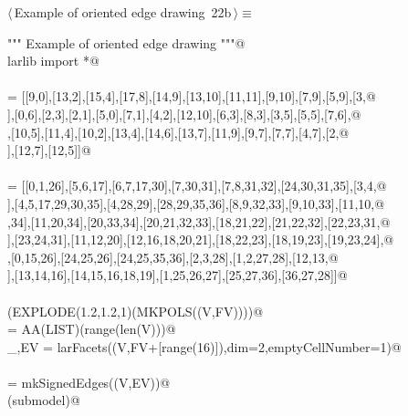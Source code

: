 \documentclass[11pt,oneside]{article}	%
\begin{document}
\begin{flushleft} \small \label{scrap36}
\protect{}$\langle\,$Example of oriented edge drawing\nobreak\ {\footnotesize 22b}$\,\rangle\equiv$
\vspace{-1ex}
\begin{list}{}{} \item
\mbox{}\verb@""" Example of oriented edge drawing """@\\
\mbox{}\verb@from larlib import *@\\
\mbox{}\verb@@\\
\mbox{}\verb@V = [[9,0],[13,2],[15,4],[17,8],[14,9],[13,10],[11,11],[9,10],[7,9],[5,9],[3,@\\
\mbox{}],[0,6],[2,3],[2,1],[5,0],[7,1],[4,2],[12,10],[6,3],[8,3],[3,5],[5,5],[7,6],@\\
\mbox{}\verb@[8,5],[10,5],[11,4],[10,2],[13,4],[14,6],[13,7],[11,9],[9,7],[7,7],[4,7],[2,@\\
\mbox{}],[12,7],[12,5]]@\\
\mbox{}\verb@@\\
\mbox{}\verb@FV = [[0,1,26],[5,6,17],[6,7,17,30],[7,30,31],[7,8,31,32],[24,30,31,35],[3,4,@\\
\mbox{}],[4,5,17,29,30,35],[4,28,29],[28,29,35,36],[8,9,32,33],[9,10,33],[11,10,@\\
\mbox{},34],[11,20,34],[20,33,34],[20,21,32,33],[18,21,22],[21,22,32],[22,23,31,@\\
\mbox{}],[23,24,31],[11,12,20],[12,16,18,20,21],[18,22,23],[18,19,23],[19,23,24],@\\
\mbox{}\verb@[15,19,24,26],[0,15,26],[24,25,26],[24,25,35,36],[2,3,28],[1,2,27,28],[12,13,@\\
\mbox{}],[13,14,16],[14,15,16,18,19],[1,25,26,27],[25,27,36],[36,27,28]]@\\
\mbox{}\verb@@\\
\mbox{}\verb@VIEW(EXPLODE(1.2,1.2,1)(MKPOLS((V,FV))))@\\
\mbox{}\verb@VV = AA(LIST)(range(len(V)))@\\
\mbox{}\verb@_,EV = larFacets((V,FV+[range(16)]),dim=2,emptyCellNumber=1)@\\
\mbox{}\verb@@\\
\mbox{}\verb@submodel = mkSignedEdges((V,EV))@\\
\mbox{}\verb@VIEW(submodel)@\\

\end{list}
\end{flushleft}
\end{document}

